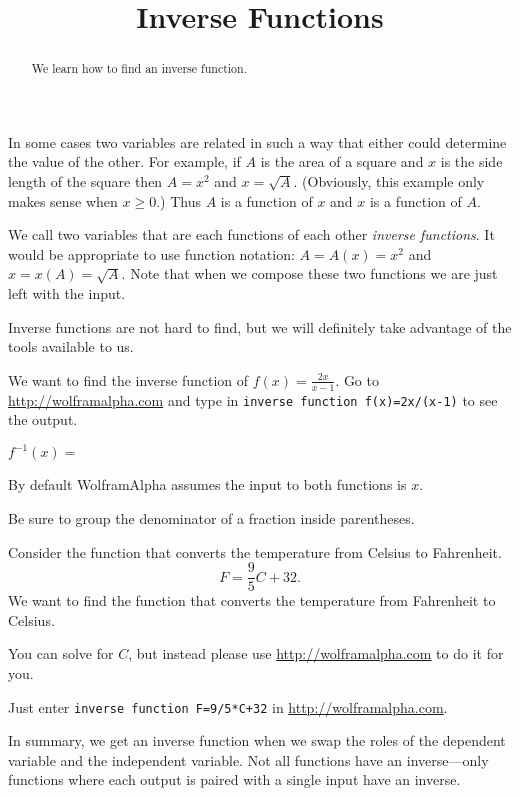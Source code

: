 \documentclass{ximera}
\title{Inverse Functions}
\begin{document}
\begin{abstract}
We learn how to find an inverse function.
\end{abstract}
\maketitle

In some cases two variables are related in such a way that either could determine the value of the other. For example, if $A$ is the area of a square and $x$ is the side length of the square then $A=x^2$ and $x=\sqrt{A}$. (Obviously, this example only makes sense when $x\geq 0$.) Thus $A$ is a function of $x$ and $x$ is a function of $A$.

We call two variables that are each functions of each other \emph{inverse functions}. It would be appropriate to use function notation: $A=A(x)=x^2$ and $x=x(A)=\sqrt{A}$. Note that when we compose these two functions we are just left with the input. 

Inverse functions are not hard to find, but we will definitely take advantage of the tools available to us. 

\begin{question}
We want to find the inverse function of $f(x)=\frac{2x}{x-1}$.
Go to \href{http://wolframalpha.com}{http://wolframalpha.com} and type in \verb|inverse function f(x)=2x/(x-1)| to see the output.

$f^{-1}(x)=$ 
\begin{hint}
By default WolframAlpha assumes the input to both functions is $x$.
\end{hint}
\begin{hint}
Be sure to group the denominator of a fraction inside parentheses.
\end{hint}

\end{question}



\begin{question}
Consider the function that converts the temperature from Celsius to Fahrenheit. 
\[
F=\frac{9}{5}C+32.
\]
We want to find the function that converts the temperature from Fahrenheit to Celsius.

You can solve for $C$, but instead please use \href{http://wolframalpha.com}{http://wolframalpha.com} to do it for you.

\begin{multipleChoice}
\end{multipleChoice}

\begin{hint}
Just enter \verb|inverse function F=9/5*C+32| in \href{http://wolframalpha.com}{http://wolframalpha.com}.
\end{hint}


In summary, we get an inverse function when we swap the roles of the dependent variable and the independent variable. Not all functions have an inverse---only functions where each output is paired with a single input have an inverse.
\end{question}
\end{document}
